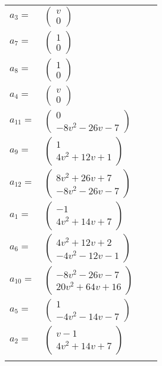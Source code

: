 \documentclass[1p]{elsarticle_modified}
\theoremstyle{definition}
\begin{document}
\begin{tabular}{m{7pt} m{180pt} m{7pt} m{180pt} }
\flushright $a_{3}=$&$\begin{pmatrix}v\\0\end{pmatrix}$ \\
\flushright $a_{7}=$&$\begin{pmatrix}1\\0\end{pmatrix}$ \\
\flushright $a_{8}=$&$\begin{pmatrix}1\\0\end{pmatrix}$ \\
\flushright $a_{4}=$&$\begin{pmatrix}v\\0\end{pmatrix}$ \\
\flushright $a_{11}=$&$\begin{pmatrix}0\\-8 v^2-26 v-7\end{pmatrix}$ \\
\flushright $a_{9}=$&$\begin{pmatrix}1\\4 v^2+12 v+1\end{pmatrix}$ \\
\flushright $a_{12}=$&$\begin{pmatrix}8 v^2+26 v+7\\-8 v^2-26 v-7\end{pmatrix}$ \\
\flushright $a_{1}=$&$\begin{pmatrix}-1\\4 v^2+14 v+7\end{pmatrix}$ \\
\flushright $a_{6}=$&$\begin{pmatrix}4 v^2+12 v+2\\-4 v^2-12 v-1\end{pmatrix}$ \\
\flushright $a_{10}=$&$\begin{pmatrix}-8 v^2-26 v-7\\20 v^2+64 v+16\end{pmatrix}$ \\
\flushright $a_{5}=$&$\begin{pmatrix}1\\-4 v^2-14 v-7\end{pmatrix}$ \\
\flushright $a_{2}=$&$\begin{pmatrix}v-1\\4 v^2+14 v+7\end{pmatrix}$\\&\end{tabular}
\end{document}
